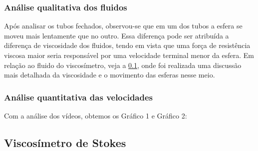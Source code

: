 \subsubsection{Análise qualitativa dos fluidos}
    Após analisar os tubos fechados, observou-se que em um dos tubos a esfera se
    moveu mais lentamente que no outro. Essa diferença pode ser atribuída a
    diferença de viscosidade dos fluidos, tendo em vista que uma força de
    resistência viscosa maior seria responsável por uma velocidade terminal
    menor da esfera. Em relação ao fluido do viscosímetro, veja
    a \cref{sec:viscStokes}, onde foi realizada uma discussão mais
    detalhada da viscosidade e o movimento das esferas nesse meio.

\subsubsection{Análise quantitativa das velocidades}
    Com a análise dos vídeos, obtemos os Gráfico 1 e Gráfico 2:

\subsection{Viscosímetro de Stokes}\label{sec:viscStokes}
